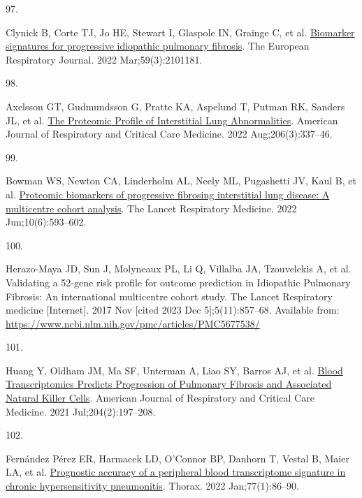 \documentclass[
]{article}
\newlength{\cslhangindent}
\newlength{\csllabelwidth}
\newenvironment{CSLReferences}[2] %
 {\begin{list}{}{%
  \setlength{\itemindent}{0pt}
  \setlength{\leftmargin}{0pt}
  \setlength{\parsep}{0pt}
  \ifodd #1
   \setlength{\leftmargin}{\cslhangindent}
   \setlength{\itemindent}{-1\cslhangindent}
  \fi
  \setlength{\itemsep}{#2\baselineskip}}}
 {\end{list}}
\newcommand{\CSLLeftMargin}[1]{\parbox[t]{\csllabelwidth}{\strut#1\strut}}
\newcommand{\CSLRightInline}[1]{\parbox[t]{\linewidth - \csllabelwidth}{\strut#1\strut}}
\begin{document}
\begin{CSLReferences}{0}{1}
\CSLLeftMargin{97. }%
\CSLRightInline{Clynick B, Corte TJ, Jo HE, Stewart I, Glaspole IN, Grainge C, et al. \href{https://doi.org/10.1183/13993003.01181-2021}{Biomarker signatures for progressive idiopathic pulmonary fibrosis}. The European Respiratory Journal. 2022 Mar;59(3):2101181. }

\CSLLeftMargin{98. }%
\CSLRightInline{Axelsson GT, Gudmundsson G, Pratte KA, Aspelund T, Putman RK, Sanders JL, et al. \href{https://doi.org/10.1164/rccm.202110-2296OC}{The {Proteomic} {Profile} of {Interstitial} {Lung} {Abnormalities}}. American Journal of Respiratory and Critical Care Medicine. 2022 Aug;206(3):337--46. }

\CSLLeftMargin{99. }%
\CSLRightInline{Bowman WS, Newton CA, Linderholm AL, Neely ML, Pugashetti JV, Kaul B, et al. \href{https://doi.org/10.1016/S2213-2600(21)00503-8}{Proteomic biomarkers of progressive fibrosing interstitial lung disease: A multicentre cohort analysis}. The Lancet Respiratory Medicine. 2022 Jun;10(6):593--602. }

\CSLLeftMargin{100. }%
\CSLRightInline{Herazo-Maya JD, Sun J, Molyneaux PL, Li Q, Villalba JA, Tzouvelekis A, et al. Validating a 52-gene risk profile for outcome prediction in {Idiopathic} {Pulmonary} {Fibrosis}: An international multicentre cohort study. The Lancet Respiratory medicine {[}Internet{]}. 2017 Nov {[}cited 2023 Dec 5{]};5(11):857--68. Available from: \url{https://www.ncbi.nlm.nih.gov/pmc/articles/PMC5677538/}}

\CSLLeftMargin{101. }%
\CSLRightInline{Huang Y, Oldham JM, Ma SF, Unterman A, Liao SY, Barros AJ, et al. \href{https://doi.org/10.1164/rccm.202008-3093OC}{Blood {Transcriptomics} {Predicts} {Progression} of {Pulmonary} {Fibrosis} and {Associated} {Natural} {Killer} {Cells}}. American Journal of Respiratory and Critical Care Medicine. 2021 Jul;204(2):197--208. }

\CSLLeftMargin{102. }%
\CSLRightInline{Fernández Pérez ER, Harmacek LD, O'Connor BP, Danhorn T, Vestal B, Maier LA, et al. \href{https://doi.org/10.1136/thoraxjnl-2020-214790}{Prognostic accuracy of a peripheral blood transcriptome signature in chronic hypersensitivity pneumonitis}. Thorax. 2022 Jan;77(1):86--90. }


\end{CSLReferences}
\end{document}
